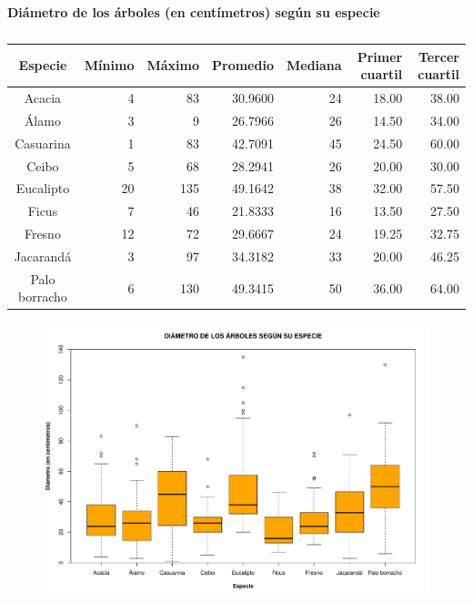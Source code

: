 \documentclass[11pt]{article}
\begin{document}
\begin{table}[h!]
  \begin{center}
    \caption*{\textbf{Diámetro de los árboles (en centímetros) según su especie}}
    \begin{tabular}{| c | r | r | r | r | r | r |}
      \hline
      \textbf{Especie} & \textbf{Mínimo} & \textbf{Máximo} & \textbf{Promedio} &
      \textbf{Mediana} & \textbf{Primer cuartil} & \textbf{Tercer cuartil}  \\ \hline
      Acacia & 4 & 83 & 30.9600 & 24 & 18.00 & 38.00 \\ \hline
      Álamo & 3 & 9 & 	26.7966 & 26 & 14.50 & 34.00 \\ \hline
      Casuarina & 1 & 83 & 42.7091 & 45 & 24.50 & 60.00 \\ \hline
      Ceibo & 5 & 68 & 28.2941 & 26 & 20.00 & 30.00 \\ \hline
      Eucalipto & 20 & 135 & 49.1642 & 38 & 32.00 & 57.50 \\ \hline
      Ficus & 7 & 46 & 21.8333 & 16 & 13.50 & 27.50 \\ \hline
      Fresno & 12 & 72 & 29.6667 & 24 & 19.25 & 32.75 \\ \hline
      Jacarandá & 3 & 97 & 34.3182 & 33 & 20.00 & 46.25 \\ \hline
      Palo borracho & 6 & 130 & 49.3415 & 50 & 36.00 & 64.00 \\ \hline
    \end{tabular}
    \caption{}
    \label{tab:tablaDiametroEspecie}
  \end{center}
\end{table}

\begin{figure}[h!]
  \begin{center}
    \includegraphics[width=0.9\linewidth]{boxDiametroEspecie.pdf}
    \caption{}
    \label{fig:boxDiametroEspecie}
  \end{center}
\end{figure}
\end{document}
